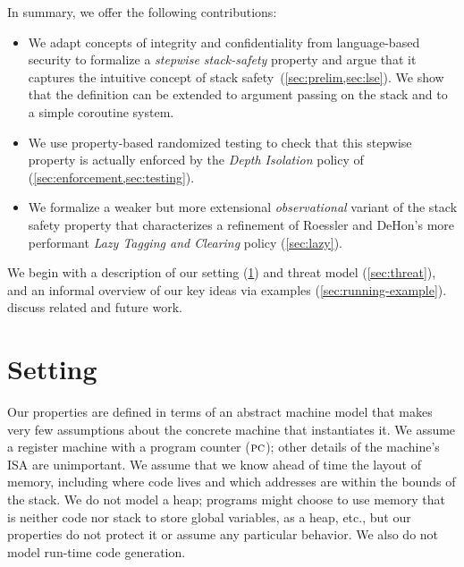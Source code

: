 \documentclass[acmsmall,review,anonymous]{acmart}\settopmatter{printfolios=true,printccs=false,printacmref=false}
\begin{document}
In summary, we offer the following contributions:

\begin{itemize}
\item We adapt concepts of integrity and confidentiality from language-based
security to formalize a {\em stepwise stack-safety}
property and argue that it captures the intuitive concept of stack
safety~(\cref{sec:prelim,sec:lse}). We show that the definition can be
extended to argument passing on the stack and to a simple coroutine system.
\item We use property-based randomized testing to check that this stepwise
property is actually enforced by the {\em Depth Isolation} policy
of~\citet{DBLP:conf/sp/RoesslerD18} (\cref{sec:enforcement,sec:testing}).
\item We formalize a
weaker but more extensional \emph{observational} variant of the stack safety
property that characterizes a refinement of Roessler and DeHon's more
performant {\em Lazy Tagging and  Clearing} policy (\cref{sec:lazy}).
\end{itemize}

We begin with a description of our setting (\cref{sec:setup}) and threat
model (\cref{sec:threat}), and an informal overview of our key ideas via
examples (\cref{sec:running-example}).  discuss related and future work.

\section{Setting}
\label{sec:setup}

Our properties are defined in terms of an abstract machine model that makes very few
assumptions about the concrete machine that instantiates it.  We assume a register
machine with a program counter (\(\textsc{pc}\)); other
details of the machine's ISA are unimportant. We assume that we know ahead of time
the layout of memory, including where code lives and which addresses are within
the bounds of the stack. We do not model a heap; programs might choose to use memory
that is neither code nor stack to store global variables, as a heap, etc., but our
properties do not protect it or assume any particular behavior. We also do not
model run-time code generation.
\end{document}
